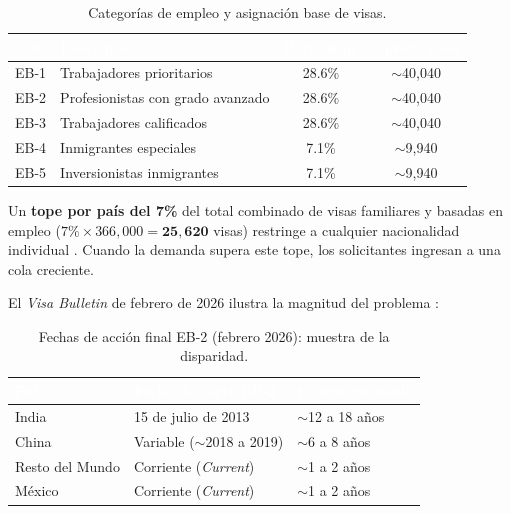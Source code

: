 \documentclass[12pt,letterpaper]{article}
\begin{document}
\begin{table}[H]
\centering
\caption{Categorías de empleo y asignación base de visas.}
\label{tab:categorias}
\renewcommand{\arraystretch}{1.3}
\begin{tabular}{clcc}
\toprule
\rowcolor{tablehead}
\textcolor{white}{\textbf{Cat.}} & \textcolor{white}{\textbf{Descripción}} & \textcolor{white}{\textbf{Porcentaje}} & \textcolor{white}{\textbf{Aprox. visas}} \\
\midrule
EB-1 & Trabajadores prioritarios & 28.6\% & $\sim$40,040 \\
\rowcolor{gray!8}
EB-2 & Profesionistas con grado avanzado & 28.6\% & $\sim$40,040 \\
EB-3 & Trabajadores calificados & 28.6\% & $\sim$40,040 \\
\rowcolor{gray!8}
EB-4 & Inmigrantes especiales & 7.1\% & $\sim$9,940 \\
EB-5 & Inversionistas inmigrantes & 7.1\% & $\sim$9,940 \\
\bottomrule
\end{tabular}
\end{table}

Un \textbf{tope por país del 7\%} del total combinado de visas familiares y basadas en empleo ($7\% \times 366{,}000 = \mathbf{25{,}620}$ visas) restringe a cualquier nacionalidad individual \parencite{crs2023, fwd2024}. Cuando la demanda supera este tope, los solicitantes ingresan a una cola creciente.

El \textit{Visa Bulletin} de febrero de 2026 ilustra la magnitud del problema \parencite{dosfeb2026}:

\begin{table}[H]
\centering
\caption{Fechas de acción final EB-2 (febrero 2026): muestra de la disparidad.}
\label{tab:bulletin}
\renewcommand{\arraystretch}{1.3}
\begin{tabular}{lll}
\toprule
\rowcolor{tablehead}
\textcolor{white}{\textbf{País}} & \textcolor{white}{\textbf{Fecha de corte EB-2}} & \textcolor{white}{\textbf{Espera estimada}} \\
\midrule
India & 15 de julio de 2013 & $\sim$12 a 18 años \\
\rowcolor{gray!8}
China & Variable ($\sim$2018 a 2019) & $\sim$6 a 8 años \\
Resto del Mundo & Corriente (\textit{Current}) & $\sim$1 a 2 años \\
\rowcolor{gray!8}
México & Corriente (\textit{Current}) & $\sim$1 a 2 años \\
\bottomrule
\end{tabular}
\end{table}
\end{document}
